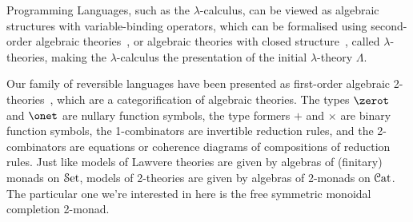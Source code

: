 Programming Languages, such as the $\lambda$-calculus, can be viewed as algebraic structures with variable-binding
operators, which can be formalised using second-order algebraic theories~\cite{fioreSecondOrderAlgebraicTheories2010},
or algebraic theories with closed structure~\cite{hylandClassicalLambdaCalculus2017}, called $\lambda$-theories, making
the $\lambda$-calculus the presentation of the initial $\lambda$-theory $\Lambda$.

Our family of reversible languages have been presented as first-order algebraic
2-theories~\cite{cohenCoherenceRewriting2theories2009,bekeCategorificationTermRewriting2011,yanofskySyntaxCoherence2000},
which are a categorification of algebraic theories. The types $\zerot$ and $\onet$ are nullary function symbols, the
type formers $+$ and $\times$ are binary function symbols, the 1-combinators are invertible reduction rules, and the
2-combinators are equations or coherence diagrams of compositions of reduction rules. Just like models of Lawvere
theories are given by algebras of (finitary) monads on $\SetCat$, models of 2-theories are given by algebras of 2-monads
on $\CatCat$. The particular one we're interested in here is the free symmetric monoidal completion 2-monad.



